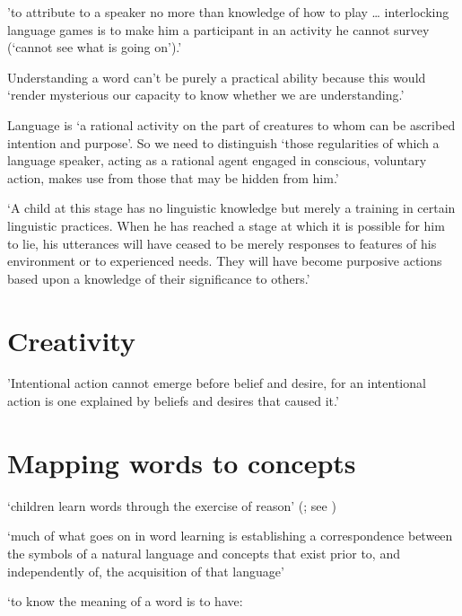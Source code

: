 \documentclass[12pt]{extarticle}
\begin{document}
\begin{multicols}{3}
'to attribute to a speaker no more than knowledge of how to play … interlocking language games is to make him a participant in an activity he cannot survey (‘cannot see what is going on’).'
\citep[p.\ 224]{Dummett:1979fb}
 
Understanding a word can’t be purely a practical ability because this would ‘render mysterious our capacity to know whether we are understanding.’
\citep[p.\ 93]{Dummett:1991yj}
 
Language is ‘a rational activity on the part of creatures to whom can be ascribed intention and purpose’. So we need to distinguish ‘those regularities of which a language speaker, acting as a rational agent engaged in conscious, voluntary action, makes use from those that may be hidden from him.’
\citep[p.\ 104]{Dummett:1978zv}
 
‘A child at this stage has no linguistic knowledge but merely a training in certain linguistic practices. When he has reached a stage at which it is possible for him to lie, his utterances will have ceased to be merely responses to features of his environment or to experienced needs. They will have become purposive actions based upon a knowledge of their significance to others.’
\citep[p.\ 95]{Dummett:1991ug}
 
 
 
\section{Creativity}
 
'Intentional action cannot emerge before belief and desire, for an intentional action is one explained by beliefs and desires that caused it.'
\citep[p.\ 10]{Davidson:1999ju}
 
 
 
\section{Mapping words to concepts}
 
‘children learn words through the exercise of reason’
(\citealp[p.\ 1103]{Bloom:2001ka}; see \citealp{Bloom:2000qz})
 
‘much of what goes on in word learning is establishing a correspondence between the symbols of a natural language and concepts that exist prior to, and independently of, the acquisition of that language’
 
\citep[p.\ 242]{Bloom:2000qz}
 
‘to know the meaning of a word is to have:


\end{multicols}
\end{document}
